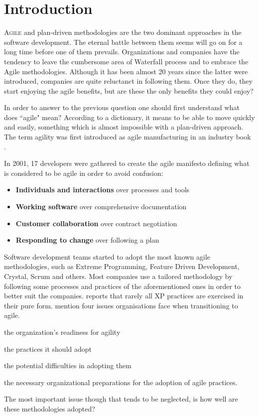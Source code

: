 \chapter{Introduction}

\lettrine[lines=4, loversize=-0.1, lraise=0.1]{A}{gile} and plan-driven methodologies are the two dominant approaches in the software development. The eternal battle between them seems will go on for a long time before  one of them prevails. Organizations and companies have the tendency to leave the cumbersome area of Waterfall process and to embrace the Agile methodologies. Although it has been almost 20 years since the latter were introduced, companies are quite reluctanct in following them. Once they do, they start enjoying the agile benefits, but are these the only benefits they could enjoy? 

In order to answer to the previous question one should first understand what does ``agile" mean? According to a dictionary, it means to be able to move quickly and easily, something which is almost impossible with a plan-driven approach. The term agility was first introduced as agile manufacturing in an industry book \cite{agile_manufacturing}.

In 2001, 17 developers were gathered to create the agile manifesto \cite{beck2001agile} defining what is considered to be agile in order to avoid confusion:  
\begin{itemize}
	\item {\large \textbf{Individuals and interactions}} over processes and tools
	\item {\large \textbf{Working software}} over comprehensive documentation
	\item {\large \textbf{Customer collaboration}} over contract negotiation
	\item {\large \textbf{Responding to change}} over following a plan
\end{itemize}

Software development teams started to adopt the most known agile methodologies, such as Extreme Programming, Feature Driven Development, Crystal, Scrum and others. Most companies use a tailored methodology by following some processes and practices of the aforementioned ones in order to better suit the companies. \citet{williams2004toward} reports that rarely all XP practices are exercised in their pure form. \citet{sidky} mention four issues organisations face when transitioning to agile.
\begin{inparaenum} [a\upshape)]
\item the organization's readiness for agility
\item the practices it should adopt
\item the potential difficulties in adopting them
\item the necessary organizational preparations for the adoption of agile practices. 
\end{inparaenum}
The most important issue though that tends to be neglected, is how well are these methodologies adopted? 

